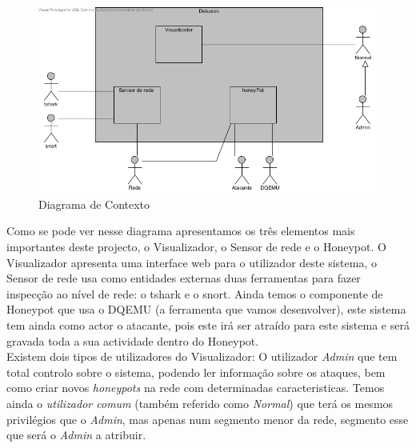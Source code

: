 \begin{figure}[!ht]
\centering
\includegraphics[scale=0.8]{images/DiagramaContexto}
\caption{Diagrama de Contexto}
\label{fig:dcont}
\end{figure}

Como se pode ver nesse diagrama apresentamos os três elementos mais importantes deste projecto, o Visualizador, o Sensor de rede e o Honeypot.
O Visualizador apresenta uma interface web para o utilizador deste sistema, o Sensor de rede usa como entidades externas duas ferramentas para fazer inspecção
ao nível de rede: o tshark e o snort. Ainda temos o componente de Honeypot que usa o DQEMU (a ferramenta que vamos desenvolver), este sistema tem ainda
como actor o atacante, pois este irá ser atraído para este sistema e será gravada toda a sua actividade dentro do Honeypot.\\
Existem dois tipos de utilizadores do Visualizador: O utilizador \emph{Admin} que tem total controlo sobre o sistema, podendo ler informação sobre os ataques, bem como
criar novos \emph{honeypots} na rede com determinadas caracteristicas. Temos ainda o \emph{utilizador comum} (também referido como \emph{Normal}) que terá os mesmos privilégios que o \emph{Admin}, mas apenas num segmento menor da rede, segmento esse que será o \emph{Admin} a atribuir.


